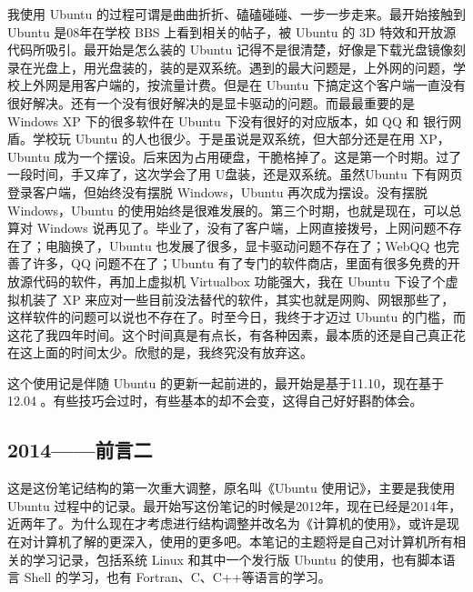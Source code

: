 \documentclass[cn,11pt,chinese,twoside]{elegantbook}
\begin{document}
    我使用 Ubuntu 的过程可谓是曲曲折折、磕磕碰碰、一步一步走来。最开始接触到 Ubuntu 是08年在学校 BBS 上看到相关的帖子，被 Ubuntu 的 3D 特效和开放源代码所吸引。最开始是怎么装的 Ubuntu 记得不是很清楚，好像是下载光盘镜像刻录在光盘上，用光盘装的，装的是双系统。遇到的最大问题是，上外网的问题，学校上外网是用客户端的，按流量计费。但是在 Ubuntu 下搞定这个客户端一直没有很好解决。还有一个没有很好解决的是显卡驱动的问题。而最最重要的是 Windows  XP 下的很多软件在 Ubuntu 下没有很好的对应版本，如 QQ 和 银行网盾。学校玩 Ubuntu 的人也很少。于是虽说是双系统，但大部分还是在用 XP， Ubuntu 成为一个摆设。后来因为占用硬盘，干脆格掉了。这是第一个时期。过了一段时间，手又痒了，这次学会了用 U盘装，还是双系统。虽然Ubuntu 下有网页登录客户端，但始终没有摆脱 Windows，Ubuntu 再次成为摆设。没有摆脱Windows，Ubuntu 的使用始终是很难发展的。第三个时期，也就是现在，可以总算对 Windows 说再见了。毕业了，没有了客户端，上网直接拨号，上网问题不存在了；电脑换了，Ubuntu 也发展了很多，显卡驱动问题不存在了；WebQQ 也完善了许多，QQ 问题不在了；Ubuntu 有了专门的软件商店，里面有很多免费的开放源代码的软件，再加上虚拟机 Virtualbox 功能强大，我在 Ubuntu 下设了个虚拟机装了 XP 来应对一些目前没法替代的软件，其实也就是网购、网银那些了，这样软件的问题可以说也不存在了。时至今日，我终于才迈过 Ubuntu 的门槛，而这花了我四年时间。这个时间真是有点长，有各种因素，最本质的还是自己真正花在这上面的时间太少。欣慰的是，我终究没有放弃这。
    
 这个使用记是伴随 Ubuntu 的更新一起前进的，最开始是基于11.10，现在基于12.04 。有些技巧会过时，有些基本的却不会变，这得自己好好斟酌体会。
 



\subsection*{2014——前言二}
这是这份笔记结构的第一次重大调整，原名叫《Ubuntu 使用记》，主要是我使用 Ubuntu 过程中的记录。最开始写这份笔记的时候是2012年，现在已经是2014年，近两年了。为什么现在才考虑进行结构调整并改名为《计算机的使用》，或许是现在对计算机了解的更深入，使用的更多吧。本笔记的主题将是自己对计算机所有相关的学习记录，包括系统 Linux 和其中一个发行版 Ubuntu 的使用，也有脚本语言 Shell 的学习，也有 Fortran、C、C++等语言的学习。


\end{document}
